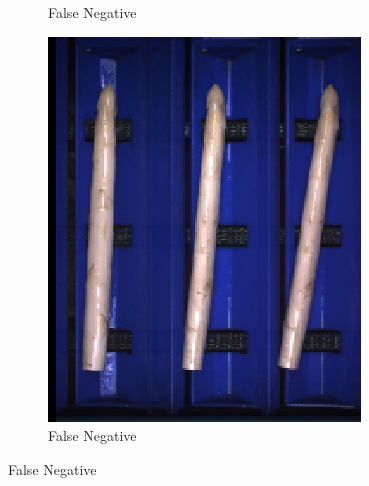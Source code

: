 \begin{figure}[!htb]
\begin{subfigure}{0.3\textwidth}
		\vspace{-5pt}
		\caption{False Negative}
	\end{subfigure}
	\begin{subfigure}{0.3\textwidth}
		\includegraphics[width=0.9\linewidth]{Figures/chapter04/hollow_falsenegative_03.png}
		\vspace{-5pt}
		\caption{False Negative}
	\end{subfigure}


\end{figure}
